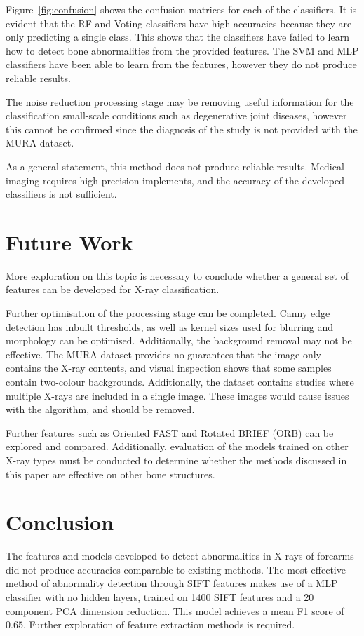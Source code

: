 \documentclass{IEEEtran}
\begin{document}
	Figure~\ref{fig:confusion} shows the confusion matrices for each of the classifiers. It is evident that the RF and Voting classifiers have high accuracies because they are only predicting a single class. This shows that the classifiers have failed to learn how to detect bone abnormalities from the provided features. The SVM and MLP classifiers have been able to learn from the features, however they do not produce reliable results. 
	
	The noise reduction processing stage may be removing useful information for the classification small-scale conditions such as degenerative joint diseases, however this cannot be confirmed since the diagnosis of the study is not provided with the MURA dataset. 
	
	As a general statement, this method does not produce reliable results. Medical imaging requires high precision implements, and the accuracy of the developed classifiers is not sufficient. 
	
	\section{Future Work} \label{sec:future}
	
	More exploration on this topic is necessary to conclude whether a general set of features can be developed for X-ray classification. 
	
	Further optimisation of the processing stage can be completed. Canny edge detection has inbuilt thresholds, as well as kernel sizes used for blurring and morphology can be optimised. Additionally, the background removal may not be effective. The MURA dataset provides no guarantees that the image only contains the X-ray contents, and visual inspection shows that some samples contain two-colour backgrounds. Additionally, the dataset contains studies where multiple X-rays are included in a single image. These images would cause issues with the algorithm, and should be removed.
	
	Further features such as Oriented FAST and Rotated BRIEF (ORB) can be explored and compared. Additionally, evaluation of the models trained on other X-ray types must be conducted to determine whether the methods discussed in this paper are effective on other bone structures.
	
	\section{Conclusion}
	
	The features and models developed to detect abnormalities in X-rays of forearms did not produce accuracies comparable to existing methods. The most effective method of abnormality detection through SIFT features makes use of a MLP classifier with no hidden layers, trained on 1400 SIFT features and a 20 component PCA dimension reduction. This model achieves a mean F1 score of $0.65$. Further exploration of feature extraction methods is required.
	
	\clearpage
	
	
\end{document}
